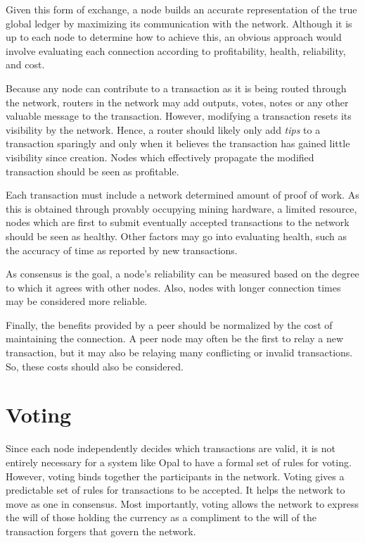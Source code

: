 \documentclass[10pt,twocolumn]{article}
\begin{document}
Given this form of exchange, a node builds an accurate representation of the true global ledger by maximizing its communication with the network.  Although it is up to each node to determine how to achieve this, an obvious approach would involve evaluating each connection according to profitability, health, reliability, and cost.

Because any node can contribute to a transaction as it is being routed through the network, routers in the network may add outputs, votes, notes or any other valuable message to the transaction.  However, modifying a transaction resets its visibility by the network.  Hence, a router should likely only add {\em tips} to a transaction sparingly and only when it believes the transaction has gained little visibility since creation.  Nodes which effectively propagate the modified transaction should be seen as profitable.

Each transaction must include a network determined amount of proof of work.  As this is obtained through provably occupying mining hardware, a limited resource, nodes which are first to submit eventually accepted transactions to the network should be seen as healthy.  Other factors may go into evaluating health, such as the accuracy of time as reported by new transactions.

As consensus is the goal, a node's reliability can be measured based on the degree to which it agrees with other nodes.  Also, nodes with longer connection times may be considered more reliable.

Finally, the benefits provided by a peer should be normalized by the cost of maintaining the connection.  A peer node may often be the first to relay a new transaction, but it may also be relaying many conflicting or invalid transactions.  So, these costs should also be considered.

\section{Voting}
Since each node independently decides which transactions are valid, it is not entirely necessary for a system like Opal to have a formal set of rules for voting.  However, voting binds together the participants in the network.  Voting gives a predictable set of rules for transactions to be accepted.  It helps the network to move as one in consensus.  Most importantly, voting allows the network to express the will of those holding the currency as a compliment to the will of the transaction forgers that govern the network.
\end{document}

